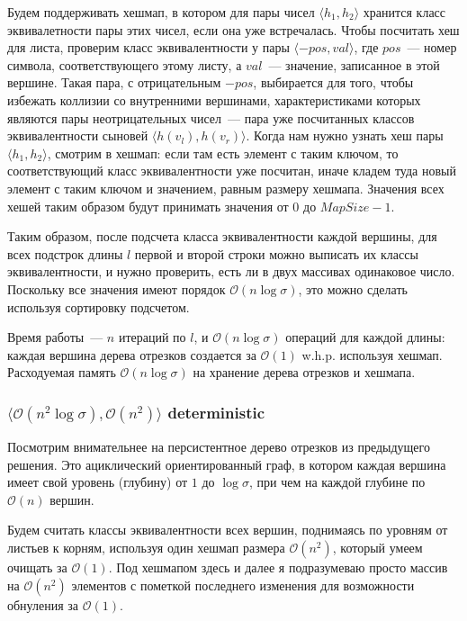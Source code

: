 Будем поддерживать хешмап, в котором для пары чисел $\langle h_1, h_2 \rangle$ хранится класс эквивалетности пары этих чисел, если она уже встречалась. Чтобы посчитать хеш для листа, проверим класс эквивалентности у пары $\langle -pos, val \rangle$, где $pos$~--- номер символа, соответствующего этому листу, а $val$~--- значение, записанное в этой вершине. Такая пара, с отрицательным $-pos$, выбирается для того, чтобы избежать коллизии со внутренними вершинами, характеристиками которых являются пары неотрицательных чисел~--- пара уже посчитанных классов эквивалентности сыновей $\langle h(v_l), h(v_r) \rangle$. Когда нам нужно узнать хеш пары $\langle h_1, h_2 \rangle$, смотрим в хешмап: если там есть элемент с таким ключом, то соответствующий класс эквивалентности уже посчитан, иначе кладем туда новый элемент с таким ключом и значением, равным размеру хешмапа. Значения всех хешей таким образом будут принимать значения от $0$ до $MapSize - 1$.

Таким образом, после подсчета класса эквивалентности каждой вершины, для всех подстрок длины $l$ первой и второй строки можно выписать их классы эквивалентности, и нужно проверить, есть ли в двух массивах одинаковое число. Поскольку все значения имеют порядок $\mathcal{O}(n \log \sigma)$, это можно сделать используя сортировку подсчетом.

Время работы~--- $n$ итераций по $l$, и $\mathcal{O}(n \log \sigma)$ операций для каждой длины: каждая вершина дерева отрезков создается за $\mathcal{O}(1)$ w.h.p. используя хешмап. Расходуемая память $\mathcal{O}(n \log \sigma)$ на хранение дерева отрезков и хешмапа.


\subsubsection{$\langle \mathcal{O}(n^2 \log \sigma), \mathcal{O}(n^2) \rangle$ deterministic}

Посмотрим внимательнее на персистентное дерево отрезков из предыдущего решения. Это ациклический ориентированный граф, в котором каждая вершина имеет свой уровень (глубину) от $1$ до $\log \sigma$, при чем на каждой глубине по $\mathcal{O}(n)$ вершин.

Будем считать классы эквивалентности всех вершин, поднимаясь по уровням от листьев к корням, используя один хешмап размера $\mathcal{O}(n^2)$, который умеем очищать за $\mathcal{O}(1)$. Под хешмапом здесь и далее я подразумеваю просто массив на $\mathcal{O}(n^2)$ элементов с пометкой последнего изменения для возможности обнуления за $\mathcal{O}(1)$.

